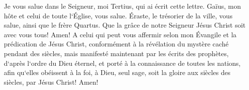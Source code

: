 \verse Je vous salue dans le Seigneur, moi Tertius, qui ai écrit cette lettre. 
\verse Gaïus, mon hôte et celui de toute l`Église, vous salue. Éraste, le trésorier de la ville, vous salue, ainsi que le frère Quartus. 
\verse Que la grâce de notre Seigneur Jésus Christ soit avec vous tous! Amen! 
\verse A celui qui peut vous affermir selon mon Évangile et la prédication de Jésus Christ, conformément à la révélation du mystère caché pendant des siècles, 
\verse mais manifesté maintenant par les écrits des prophètes, d`après l`ordre du Dieu éternel, et porté à la connaissance de toutes les nations, afin qu`elles obéissent à la foi, 
\verse à Dieu, seul sage, soit la gloire aux siècles des siècles, par Jésus Christ! Amen! 
